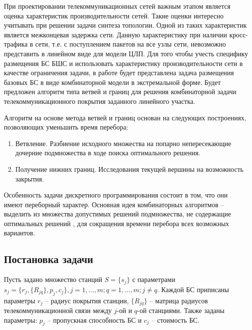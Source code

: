 При проектировании телекоммуникационных сетей важным этапом является оценка характеристик производительности сетей. Такие оценки интересно учитывать при решении задачи синтеза топологии. Одной из таких характеристик является межконцевая задержка сети. Данную характеристику при наличии кросс-трафика в сети, т.е. с поступлением пакетов на все узлы сети, невозможно представить в линейном виде для модели ЦЛП. Для того чтобы учесть специфику размещения БС БШС и использовать характеристику производительности сети в качестве ограничения задачи, в работе будет представлена задача размещения базовых БС в виде комбинаторной модели в экстремальной форме. Будет предложен алгоритм типа ветвей и границ для решения комбинаторной задачи телекоммуникационного покрытия заданного линейного участка.

Алгоритм на основе метода ветвей и границ основан на следующих построениях, позволяющих уменьшить время перебора:

\begin{enumerate}
  \item Ветвление. Разбиение исходного множества на попарно непересекающие дочерние подмножества в ходе поиска оптимального решения.
  \item Получение нижних границ. Исследования текущей вершины на возможность закрытия.
\end{enumerate}

Особенность задачи дискретного программирования состоит в том, что они имеют переборный характер. Основная идея комбинаторных алгоритмов -- выделить из множества допустимых решений подмножества, не содержащие оптимальных решений \cite{SigalBook}, для сокращения времени перебора всех возможных вариантов. 




\subsection{Постановка задачи}

Пусть задано множество станций $S=\{s_j\}$ с параметрами $s_j=\{r_j,\{R_{jq} \},p_j, c_j \},j=1,...,m;q=1,...,m;j \neq q $. Каждой БС приписаны параметры $r_j$ -- радиус покрытия станции, $\{R_{jq} \}$ -- матрица радиусов телекоммуникационной  связи между $j$-ой и $q$-ой станциями. Также заданы параметры: $p_j$ -- пропускная способность БС и $c_j$ -- стоимость БС.


